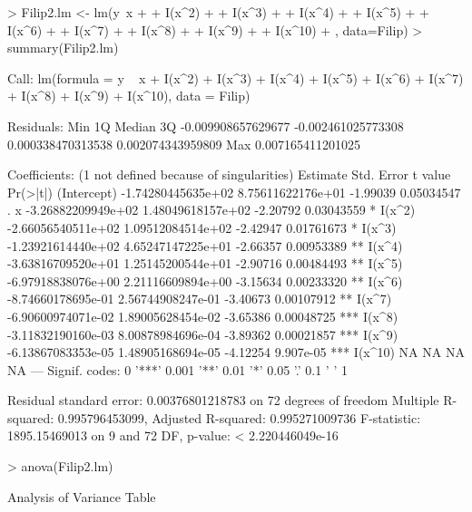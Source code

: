 \documentclass[10pt]{article}
\begin{document}
\begin{Schunk}
\begin{Sinput}
> Filip2.lm <- lm(y~x + 
+                    I(x^2) +
+                    I(x^3) +
+                    I(x^4) +
+                    I(x^5) +
+                    I(x^6) +
+                    I(x^7) +
+                    I(x^8) +
+                    I(x^9) +
+                    I(x^10) 
+                 , data=Filip)
> summary(Filip2.lm)
\end{Sinput}
\begin{Soutput}
Call:
lm(formula = y ~ x + I(x^2) + I(x^3) + I(x^4) + I(x^5) + I(x^6) + 
    I(x^7) + I(x^8) + I(x^9) + I(x^10), data = Filip)

Residuals:
               Min                 1Q             Median                 3Q 
-0.009908657629677 -0.002461025773308  0.000338470313538  0.002074343959809 
               Max 
 0.007165411201025 

Coefficients: (1 not defined because of singularities)
                      Estimate         Std. Error  t value   Pr(>|t|)    
(Intercept) -1.74280445635e+02  8.75611622176e+01 -1.99039 0.05034547 .  
x           -3.26882209949e+02  1.48049618157e+02 -2.20792 0.03043559 *  
I(x^2)      -2.66056540511e+02  1.09512084514e+02 -2.42947 0.01761673 *  
I(x^3)      -1.23921614440e+02  4.65247147225e+01 -2.66357 0.00953389 ** 
I(x^4)      -3.63816709520e+01  1.25145200544e+01 -2.90716 0.00484493 ** 
I(x^5)      -6.97918838076e+00  2.21116609894e+00 -3.15634 0.00233320 ** 
I(x^6)      -8.74660178695e-01  2.56744908247e-01 -3.40673 0.00107912 ** 
I(x^7)      -6.90600974071e-02  1.89005628454e-02 -3.65386 0.00048725 ***
I(x^8)      -3.11832190160e-03  8.00878984696e-04 -3.89362 0.00021857 ***
I(x^9)      -6.13867083353e-05  1.48905168694e-05 -4.12254  9.907e-05 ***
I(x^10)                     NA                 NA       NA         NA    
---
Signif. codes:  0 '***' 0.001 '**' 0.01 '*' 0.05 '.' 0.1 ' ' 1

Residual standard error: 0.00376801218783 on 72 degrees of freedom
Multiple R-squared:  0.995796453099,	Adjusted R-squared:  0.995271009736 
F-statistic: 1895.15469013 on 9 and 72 DF,  p-value: < 2.220446049e-16
\end{Soutput}
\begin{Sinput}
> anova(Filip2.lm)
\end{Sinput}
\begin{Soutput}
Analysis of Variance Table


\end{Soutput}
\end{Schunk}
\end{document}
